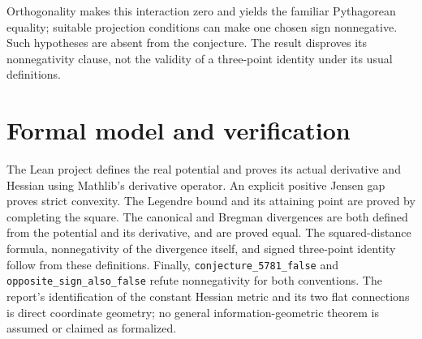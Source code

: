 \documentclass[11pt]{article}
\begin{document}
Orthogonality makes this interaction zero and yields the familiar
Pythagorean equality; suitable projection conditions can make one chosen
sign nonnegative. Such hypotheses are absent from the conjecture.
The result disproves its nonnegativity clause, not the validity of a
three-point identity under its usual definitions.

\section*{Formal model and verification}
The Lean project defines the real potential and proves its actual
derivative and Hessian using Mathlib's derivative operator.
An explicit positive Jensen gap proves strict convexity.
The Legendre bound and its attaining point are proved by completing
the square. The canonical and Bregman divergences are both defined from
the potential and its derivative, and are proved equal.
The squared-distance formula, nonnegativity of the divergence itself,
and signed three-point identity follow from these definitions.
Finally, \texttt{conjecture\_5781\_false} and
\texttt{opposite\_sign\_also\_false} refute nonnegativity for both conventions.
The report's identification of the constant Hessian metric and its two
flat connections is direct coordinate geometry; no general
information-geometric theorem is assumed or claimed as formalized.
\end{document}
